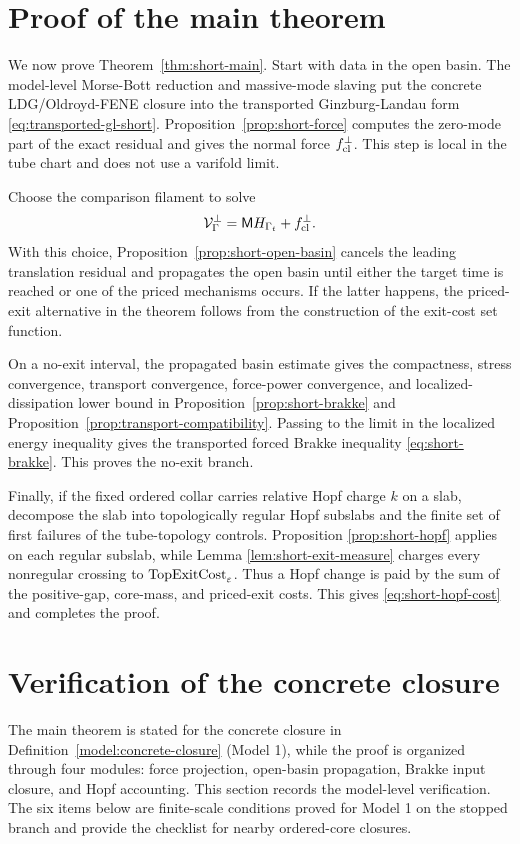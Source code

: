 \documentclass[11pt]{article}
\theoremstyle{definition}
\newcommand{\eps}{\varepsilon}
\newcommand{\Mmob}{\mathsf M}
\newcommand{\Vrel}{\mathcal V}
\begin{document}
\section{Proof of the main theorem}
\label{sec:main-proof}

We now prove Theorem~\ref{thm:short-main}.  Start with data in the open basin.
The model-level Morse-Bott reduction and massive-mode slaving put the concrete
LDG/Oldroyd-FENE closure into the transported Ginzburg-Landau form
\eqref{eq:transported-gl-short}.  Proposition~\ref{prop:short-force} computes
the zero-mode part of the exact residual and gives the normal force
\(f_{\rm cl}^\perp\).  This step is local in the tube chart and does not use a
varifold limit.

Choose the comparison filament to solve
\[
        \Vrel_\Gamma^\perp=\Mmob H_{\Gamma_t}+f_{\rm cl}^\perp .
\]
With this choice, Proposition~\ref{prop:short-open-basin} cancels the leading
translation residual and propagates the open basin until either the target time
is reached or one of the priced mechanisms occurs.  If the latter happens, the
priced-exit alternative in the theorem follows from the construction of the
exit-cost set function.

On a no-exit interval, the propagated basin estimate gives the compactness,
stress convergence, transport convergence, force-power convergence, and
localized-dissipation lower bound in Proposition~\ref{prop:short-brakke} and
Proposition~\ref{prop:transport-compatibility}.  Passing to the limit in the
localized energy inequality gives the transported forced Brakke inequality
\eqref{eq:short-brakke}.  This proves the no-exit branch.

Finally, if the fixed ordered collar carries relative Hopf charge \(k\) on a
slab, decompose the slab into topologically regular Hopf subslabs and the
finite set of first failures of the tube-topology controls.  Proposition
\ref{prop:short-hopf} applies on each regular subslab, while Lemma
\ref{lem:short-exit-measure} charges every nonregular crossing to
\({\rm TopExitCost}_\eps\).  Thus a Hopf change is paid by the sum of the
positive-gap, core-mass, and priced-exit costs.  This gives
\eqref{eq:short-hopf-cost} and completes the proof.


\section{Verification of the concrete closure}
\label{sec:verification}

The main theorem is stated for the concrete closure in
Definition~\ref{model:concrete-closure} (Model 1), while the proof is organized
through four modules: force projection, open-basin propagation, Brakke input
closure, and Hopf accounting.  This section records the model-level
verification.  The six items below are finite-scale conditions proved for Model
1 on the stopped branch and provide the checklist for nearby ordered-core
closures.
\end{document}
